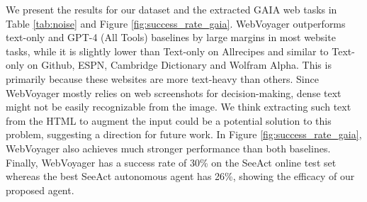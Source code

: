 \documentclass[11pt]{article}
\begin{document}
We present the results for our dataset and the extracted GAIA web tasks in Table \ref{tab:noise} and Figure \ref{fig:success_rate_gaia}. %
WebVoyager outperforms text-only and GPT-4 (All Tools) baselines by large margins in most website tasks, while it is slightly lower than Text-only on Allrecipes and similar to Text-only on Github, ESPN, Cambridge Dictionary and Wolfram Alpha. This is primarily because these websites are more text-heavy than others. Since WebVoyager mostly relies on web screenshots for decision-making, dense text might not be easily recognizable from the image. We think extracting such text from the HTML to augment the input could be a potential solution to this problem, suggesting a direction for future work. 
In Figure \ref{fig:success_rate_gaia}, WebVoyager also achieves much stronger performance than both baselines. Finally, WebVoyager has a success rate of 30\% on the SeeAct online test set whereas the best SeeAct autonomous agent has 26\%, showing the efficacy of our proposed agent.
\end{document}
